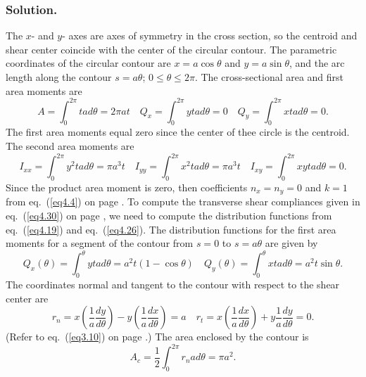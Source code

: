 \documentclass{AeroStructure-ERJohnson}
\begin{document}
\begin{example*}
\subsubsection{Solution.} The $x$- and $y$- axes are axes of symmetry in the cross section, so the centroid and shear center coincide with the center of the circular contour. The parametric coordinates of the circular contour are $x=a \cos \theta$ and $y=a \sin \theta$, and the arc length along the contour $s=a \theta$; $0 \leq \theta \leq 2 \pi$. The cross-sectional area and first area moments are
\begin{equation*}
A=\int_{0}^{2 \pi} t a d \theta=2 \pi a t \quad Q_{x}=\int_{0}^{2 \pi} y {tad} \theta=0 \quad Q_{y}=\int_{0}^{2 \pi} x t a d \theta=0.\tag{a}
\end{equation*}
The first area moments equal zero since the center of thee circle is the centroid. The second area moments are
\begin{equation*}
I_{x x}=\int_{0}^{2 \pi} y^{2} t a d \theta=\pi a^{3} t \quad I_{y y}=\int_{0}^{2 \pi} x^{2} t a d \theta=\pi a^{3} t \quad I_{x y}=\int_{0}^{2 \pi} x y t a d \theta=0.\tag{b}
\end{equation*}
Since the product area moment is zero, then coefficients $n_{x}=n_{y}=0$ and $k=1$ from eq.~(\ref{eq4.4}) on page \pageref{eq4.4}. To compute the transverse shear compliances given in eq.~(\ref{eq4.30}) on page \pageref{eq4.30}, we need to compute the distribution functions from eq.~(\ref{eq4.19}) and eq.~(\ref{eq4.26}). The distribution functions for the first area moments for a segment of the contour from $s=0$ to $s=a \theta$ are given by
\begin{equation*}
Q_{x}(\theta)=\int_{0}^{\theta} y {tad} \theta=a^{2} t(1-\cos \theta) \quad Q_{y}(\theta)=\int_{0}^{\theta} x t a d \theta=a^{2} t \sin \theta.\tag{c}
\end{equation*}
The coordinates normal and tangent to the contour with respect to the shear center are
\begin{equation*}
r_{n}=x\left(\frac{1}{a} \frac{d y}{d \theta}\right)-y\left(\frac{1}{a} \frac{d x}{d \theta}\right)=a \quad r_{t}=x\left(\frac{1}{a} \frac{d x}{d \theta}\right)+y \frac{1}{a} \frac{d y}{d \theta}=0.\tag{d}
\end{equation*}
(Refer to eq.~(\ref{eq3.10}) on page \pageref{eq3.10}.) The area enclosed by the contour is
\begin{equation*}
A_{c}=\frac{1}{2} \int_{0}^{2 \pi} r_{n} a d \theta=\pi a^{2}.\tag{e}
\end{equation*}

\end{example*}
\end{document}
